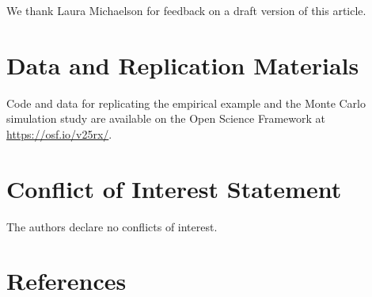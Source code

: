 \documentclass[
  american,
  man, donotrepeattitle,floatsintext]{apa7}
\begin{document}
We thank Laura Michaelson for feedback on a draft version of this article.

\section*{Data and Replication Materials}\label{data-and-replication-materials}

Code and data for replicating the empirical example and the Monte Carlo simulation study are available on the Open Science Framework at \url{https://osf.io/v25rx/}.

\section*{Conflict of Interest Statement}\label{conflict-of-interest-statement}

The authors declare no conflicts of interest.

\section*{References}\label{references}

\begingroup
\singlespacing
\setlength{\parindent}{-0.5in}
\setlength{\leftskip}{0.5in}
\end{document}
